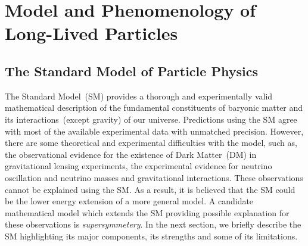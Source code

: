 
\chapter{Model and Phenomenology of Long-Lived Particles}
\label{Long_Lived_Particle_physics_chapter}


\section{The Standard Model of Particle Physics}
The Standard Model~(SM) provides a thorough and experimentally valid mathematical description of the fundamental constituents of baryonic matter and its interactions~(except gravity) of our universe. Predictions using the SM agree with most of the available experimental data with unmatched precision.
However, there are some theoretical and experimental difficulties with the model, such as, the observational evidence for the existence of Dark Matter~(DM) in gravitational lensing experiments, the experimental evidence for neutrino oscillation and neutrino masses and gravitational interactions. These observations cannot be explained using the SM.  As a result, it is believed that the SM could be the lower energy extension of a more general model. A candidate mathematical model which extends the SM providing possible explanation for these observations is \textit{supersymmetery}.
In the next section, we briefly describe the SM highlighting its major components, its strengths and some of its limitations.

